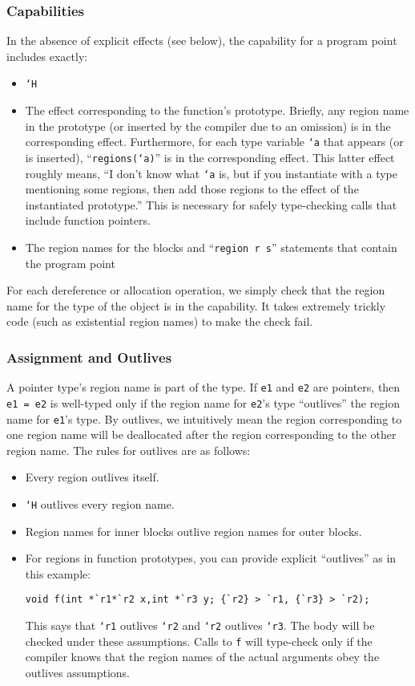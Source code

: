 \subsubsection{Capabilities}

In the absence of explicit effects (see below), the capability for a
program point includes exactly:
\begin{itemize}
\item \texttt{`H}
\item The effect corresponding to the function's prototype.  Briefly,
any region name in the prototype (or inserted by the compiler due to
an omission) is in the corresponding effect.  Furthermore, for each
type variable \texttt{`a} that appears (or is inserted),
``\texttt{regions(`a)}'' is in the corresponding effect.  This latter
effect roughly means, ``I don't know what \texttt{`a} is, but if you
instantiate with a type mentioning some regions, then add those
regions to the effect of the instantiated prototype.''  This is
necessary for safely type-checking calls that include function pointers.
\item The region names for the blocks and ``\texttt{region r s}''
  statements that contain the program point
\end{itemize}

For each dereference or allocation operation, we simply check that the
region name for the type of the object is in the capability.  It takes
extremely trickly code (such as existential region names) to make the
check fail.

\subsubsection{Assignment and Outlives}

A pointer type's region name is part of the type.  If \texttt{e1} and
\texttt{e2} are pointers, then \texttt{e1 = e2} is well-typed only if
the region name for \texttt{e2}'s type ``outlives'' the region name
for \texttt{e1}'s type.  By outlives, we intuitively mean the region
corresponding to one region name will be deallocated after the region
corresponding to the other region name.  The rules for outlives are as
follows:
\begin{itemize}
\item Every region outlives itself.
\item \texttt{`H} outlives every region name.
\item Region names for inner blocks outlive region names for outer
blocks.
\item For regions in function prototypes, you can provide explicit
``outlives'' as in this example:
\begin{verbatim}
void f(int *`r1*`r2 x,int *`r3 y; {`r2} > `r1, {`r3} > `r2);
\end{verbatim}
This says that \texttt{`r1} outlives \texttt{`r2} and \texttt{`r2}
outlives \texttt{`r3}.  The body will be checked under these
assumptions.  Calls to \texttt{f} will type-check only if the compiler
knows that the region names of the actual arguments obey the outlives
assumptions.
\end{itemize}

